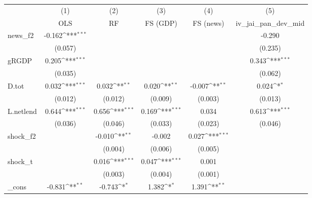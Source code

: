 {
\def\sym#1{\ifmmode^{#1}\else\(^{#1}\)\fi}
\begin{tabular}{l*{5}{c}}
\toprule
            &\multicolumn{1}{c}{(1)}&\multicolumn{1}{c}{(2)}&\multicolumn{1}{c}{(3)}&\multicolumn{1}{c}{(4)}&\multicolumn{1}{c}{(5)}\\
            &\multicolumn{1}{c}{OLS}&\multicolumn{1}{c}{RF}&\multicolumn{1}{c}{FS (GDP)}&\multicolumn{1}{c}{FS (news)}&\multicolumn{1}{c}{iv\_jai\_pan\_dev\_mid}\\
\midrule
news\_f2     &      -0.162\sym{***}&                     &                     &                     &      -0.290         \\
            &     (0.057)         &                     &                     &                     &     (0.235)         \\
\addlinespace
gRGDP       &       0.205\sym{***}&                     &                     &                     &       0.343\sym{***}\\
            &     (0.035)         &                     &                     &                     &     (0.062)         \\
\addlinespace
D.tot       &       0.032\sym{***}&       0.032\sym{**} &       0.020\sym{**} &      -0.007\sym{**} &       0.024\sym{*}  \\
            &     (0.012)         &     (0.012)         &     (0.009)         &     (0.003)         &     (0.013)         \\
\addlinespace
L.netlend   &       0.644\sym{***}&       0.656\sym{***}&       0.169\sym{***}&       0.034         &       0.613\sym{***}\\
            &     (0.036)         &     (0.046)         &     (0.033)         &     (0.023)         &     (0.046)         \\
\addlinespace
shock\_f2    &                     &      -0.010\sym{**} &      -0.002         &       0.027\sym{***}&                     \\
            &                     &     (0.004)         &     (0.006)         &     (0.005)         &                     \\
\addlinespace
shock\_t     &                     &       0.016\sym{***}&       0.047\sym{***}&       0.001         &                     \\
            &                     &     (0.003)         &     (0.004)         &     (0.001)         &                     \\
\addlinespace
\_cons      &      -0.831\sym{**} &      -0.743\sym{*}  &       1.382\sym{*}  &       1.391\sym{**} &                     \\

\end{tabular}}
